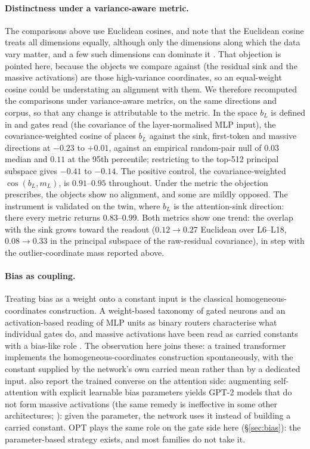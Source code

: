 \documentclass[11pt]{article}
\newcommand{\bl}{b_L}
\begin{document}
\paragraph{Distinctness under a variance-aware metric.} The comparisons
above use Euclidean cosines, and \citet{ying2026} note that the Euclidean
cosine treats all dimensions equally, although only the dimensions along
which the data vary matter, and a few such dimensions can dominate it
\citep{timkey2021}. That objection is pointed here, because the objects
we compare against (the residual sink and the massive activations)
are those high-variance coordinates, so an
equal-weight cosine could be understating an alignment with them. We
therefore recomputed the comparisons under variance-aware metrics, on
the same directions and corpus, so that any change is attributable to
the metric. In the space $\bl$
is defined in and gates read (the covariance of the layer-normalised
MLP input), the covariance-weighted cosine of \citet{ying2026} places
$\bl$ against the sink, first-token and massive directions at $-0.23$
to $+0.01$, against an empirical random-pair null of $0.03$ median and
$0.11$ at the 95th percentile; restricting to the top-512 principal
subspace gives $-0.41$ to $-0.14$. The positive control, the covariance-weighted
$\cos(\bl, m_L)$, is $0.91$--$0.95$ throughout. Under the
metric the objection prescribes, the objects show no alignment, and
some are mildly opposed. The instrument is validated on the twin, where
$\bl$ is the attention-sink direction: there every metric returns
$0.83$--$0.99$. Both metrics show one trend: the overlap with the sink grows toward the readout
($0.12 \to 0.27$ Euclidean over L6--L18, $0.08 \to 0.33$ in the
principal subspace of the raw-residual covariance), in step with the outlier-coordinate mass
reported above.

\paragraph{Bias as coupling.} Treating bias as a weight onto a
constant input is the classical homogeneous-coordinates construction.
A weight-based taxonomy of gated neurons \citep{gerstner2025} and an
activation-based reading of MLP units as binary routers
\citep{balogh2026} characterise what individual gates do, and massive
activations have been read as carried constants with a bias-like role
\citep{sun2024,ssun2026}. The observation here joins these: a trained
transformer implements the homogeneous-coordinates construction
spontaneously, with the constant supplied by the network's own
carried mean rather than by a dedicated input.
\citet{sun2024} also report the trained converse on the attention
side: augmenting self-attention with explicit learnable bias
parameters yields GPT-2 models that do not form massive activations
(the same remedy is ineffective in some other architectures;
\citealp{owen2025}): given the parameter, the network uses it instead of building a carried
constant. OPT plays the same role on the gate side here
(\S\ref{sec:bias}): the parameter-based strategy exists, and most
families do not take it.
\end{document}
